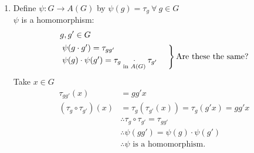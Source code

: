 \begin{theorem}
\begin{enumerate}
\noindent \textbf{Example:} $b$-row of Cayley table gives $y$ values for the map "L-multiply by $b$"
\begin{align}
    &\tau_b : G\rightarrow G \nonumber \\
    &\tau_b(x)=bx \ \forall \ x \in G \nonumber
\end{align}
\hrule
Now,
\begin{align}
    \forall \ g\in G, \text{ define } &\tau_g: G\rightarrow G \nonumber \\
    \text{by }&\tau_g(x)=gx \ \forall \ x \in G. \nonumber
\end{align}
\textit{Claim:} $\tau_g$ has an inverse, namely $\tau_{g^{-1}}$\\
\textit{Proof:} $x\in G$
\begin{align}
    (\tau_{g^{-1}} \circ \tau_g)(x)&=\tau_{g^{-1}}(gx)=g^{-1}gx=ex=x \nonumber \\
    (\tau_g \circ \tau_{g^{-1}})(x)&=\tau_{g}(g^{-1}x)=gg^{-1}x=ex=x \nonumber \\
    \therefore (\tau_{g^{-1}} \circ \tau_g) &= I_G \text{ and } (\tau_g \circ \tau_{g^{-1}})= I_G \nonumber \\
    \therefore \tau_g &\text{ has and inverse.} \nonumber \\
    \therefore \tau_g &\text{ is a bijection by Lemma 1.2.3} \nonumber
\end{align}
So $\tau_g \in A(G)$
\item Define $\psi:G\rightarrow A(G)$ by $\psi(g)=\tau_g \ \forall \ g\in G$ \\
$\psi$ is a homomorphism:
\begin{align}
    &g,g' \in G \nonumber \\
    &\begin{rcases}
    \psi(g\cdot g')=\tau_{gg'}  \\
    \psi(g)\cdot \psi(g')=\tau_{g}\underset{\text{in }A(G)}{\cdot} \tau_{g'} \ \ \ \
    \end{rcases}\text{Are these the same?} \nonumber
\end{align}
Take $x\in G$
\begin{align}
    \tau_{gg'}(x)&=gg'x \nonumber \\
    (\tau_g\circ \tau_{g'})(x)&= \tau_g(\tau_{g'}(x))=\tau_g(g'x)=gg'x \nonumber \\
    &\therefore \tau_g\circ\tau_{g'}=\tau_{gg'} \nonumber \\
    &\therefore \psi(gg')=\psi(g)\cdot \psi(g') \nonumber \\
    &\therefore \psi \text{ is a homomorphism.} \nonumber

\end{align}
\end{enumerate}
\end{theorem}
